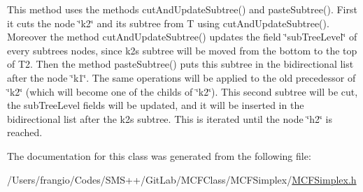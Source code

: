 This method uses the methods cut\+And\+Update\+Subtree() and paste\+Subtree(). First it cuts the node \char`\"{}k2\char`\"{} and its subtree from T using cut\+And\+Update\+Subtree(). Moreover the method cut\+And\+Update\+Subtree() updates the field \char`\"{}sub\+Tree\+Level\char`\"{} of every subtree\textquotesingle{}s nodes, since k2\textquotesingle{}s subtree will be moved from the bottom to the top of T2. Then the method paste\+Subtree() puts this subtree in the bidirectional list after the node \char`\"{}k1\char`\"{}. The same operations will be applied to the old precedessor of \char`\"{}k2\char`\"{} (which will become one of the childs of \char`\"{}k2\char`\"{}). This second subtree will be cut, the sub\+Tree\+Level fields will be updated, and it will be inserted in the bidirectional list after the k2\textquotesingle{}s subtree. This is iterated until the node \char`\"{}h2\char`\"{} is reached. 

The documentation for this class was generated from the following file\+:\begin{DoxyCompactItemize}
\item 
/\+Users/frangio/\+Codes/\+S\+M\+S++/\+Git\+Lab/\+M\+C\+F\+Class/\+M\+C\+F\+Simplex/\mbox{\hyperlink{_m_c_f_simplex_8h}{M\+C\+F\+Simplex.\+h}}\end{DoxyCompactItemize}
